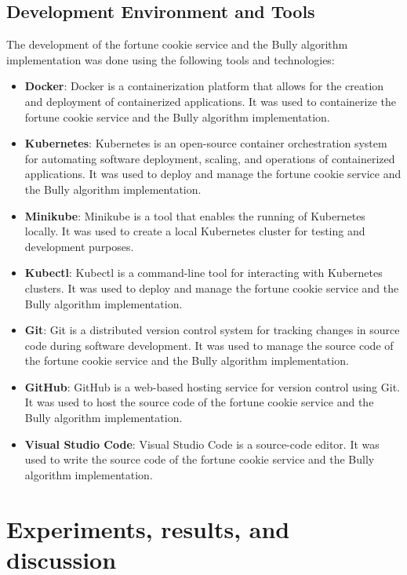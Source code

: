 \documentclass{article}
\begin{document}
  \subsection{Development Environment and Tools}
    The development of the fortune cookie service and the Bully algorithm implementation was done using the following tools and technologies:
    \begin{itemize}
      \item \textbf{Docker}: Docker is a containerization platform that allows for the creation and deployment of containerized applications. It was used to containerize the fortune cookie service and the Bully algorithm implementation.
      \item \textbf{Kubernetes}: Kubernetes is an open-source container orchestration system for automating software deployment, scaling, and operations of containerized applications. It was used to deploy and manage the fortune cookie service and the Bully algorithm implementation.
      \item \textbf{Minikube}: Minikube is a tool that enables the running of Kubernetes locally. It was used to create a local Kubernetes cluster for testing and development purposes.
      \item \textbf{Kubectl}: Kubectl is a command-line tool for interacting with Kubernetes clusters. It was used to deploy and manage the fortune cookie service and the Bully algorithm implementation.
      \item \textbf{Git}: Git is a distributed version control system for tracking changes in source code during software development. It was used to manage the source code of the fortune cookie service and the Bully algorithm implementation.
      \item \textbf{GitHub}: GitHub is a web-based hosting service for version control using Git. It was used to host the source code of the fortune cookie service and the Bully algorithm implementation.
      \item \textbf{Visual Studio Code}: Visual Studio Code is a source-code editor. It was used to write the source code of the fortune cookie service and the Bully algorithm implementation.
    \end{itemize}
    
    
\section{Experiments, results, and discussion}
\end{document}
